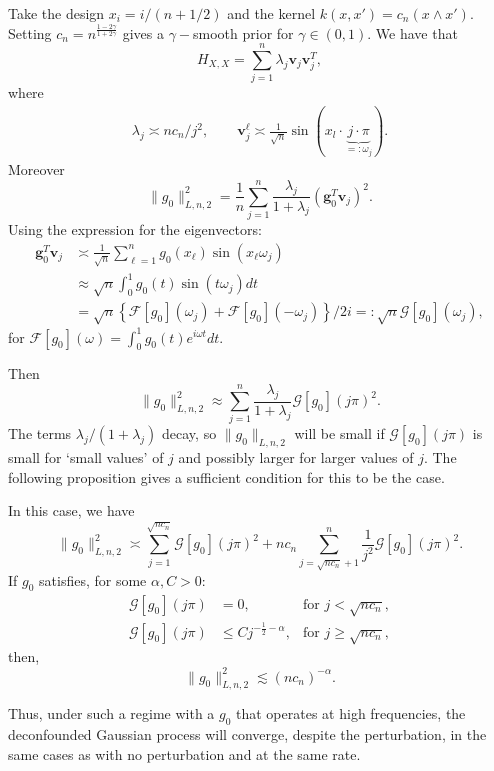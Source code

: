 \documentclass[11pt]{article}
\newcommand{\bv}{\mathbf{v}}
\numberwithin{equation}{section}
\begin{document}
Take the design $x_i = i/(n+1/2)$ and the kernel $k(x, x') = c_n (x \wedge x')$. Setting  $c_n = n^\frac{1-2\gamma}{1+2\gamma}$ gives a $\gamma-$smooth prior for $\gamma \in (0, 1)$. We have that
$$
H_{X, X} = \sum_{j = 1}^n \lambda_j \bv_j \bv_j^T,
$$
where
\begin{align*}
	\lambda_j  \asymp n c_n/j^2,\qquad \bv_j^\ell \asymp  \frac{1}{\sqrt{n}}\sin(x_l \cdot \underbrace{j \cdot \pi}_{=: \omega_j}).
\end{align*}
Moreover
$$
\|g_0\|_{L, n, 2}^2 = \frac{1}{n}\sum_{j = 1}^n \frac{\lambda_j}{1+\lambda_j} (\mathbf{g}_0^T\mathbf{v}_j)^2.
$$
Using the expression for the eigenvectors:
\begin{align*}
\mathbf{g}_0^T\mathbf{v}_j &\asymp \frac{1}{\sqrt{n}}\sum_{\ell = 1}^n g_0(x_\ell)\sin(x_\ell \omega_j) \\
 &\approx \sqrt{n} \int_0^1 g_0(t)\sin(t \omega_j) dt \\ 
 &= \sqrt{n}\left\{\mathcal{F}[g_0](\omega_j) + \mathcal{F}[g_0](-\omega_j)\right\}/2i =:\sqrt{n}\mathcal{G}[g_0](\omega_j),
\end{align*}
for $\mathcal{F}[g_0](\omega) = \int_{0}^1 g_0(t) e^{i\omega t} dt$.

Then
$$
\|g_0\|_{L, n, 2}^2 \approx \sum_{j = 1}^n\frac{\lambda_j}{1+\lambda_j} \mathcal{G}[g_0](j \pi)^2.
$$
The terms $\lambda_j/(1+\lambda_j)$ decay, so $\|g_0\|_{L, n, 2}$ will be small if $\mathcal{G}[g_0](j \pi)$ is small for `small values' of $j$ and possibly larger for larger values of $j$. The following proposition gives a sufficient condition for this to be the case.
\begin{proposition}\label{prop:g0_control_FDBM}
In this case, we have
$$
\|g_0\|_{L, n, 2}^2 \asymp \sum_{j = 1}^{\sqrt{nc_n}}  \mathcal{G}[g_0](j \pi)^2 + n c_n \sum_{j = \sqrt{nc_n} + 1}^{n} \frac{1}{j^2 } \mathcal{G}[g_0](j \pi)^2.
$$
If $g_0$ satisfies, for some $\alpha, C > 0$:
\begin{align*}
	\mathcal{G}[g_0](j\pi) &= 0,  &\textrm{for } j < \sqrt{nc_n}, \\
		\mathcal{G}[g_0](j\pi) &\leq C j^{-\frac{1}{2} - \alpha}, &\textrm{for } j \geq \sqrt{nc_n}, 
\end{align*}
then,
$$
\|g_0\|_{L, n, 2}^2 \lesssim (nc_n)^{-\alpha}.
$$
\end{proposition}
Thus, under such a regime with a $g_0$ that operates at high frequencies, the deconfounded Gaussian process will converge, despite the perturbation, in the same cases as with no perturbation and at the same rate.
\end{document}
